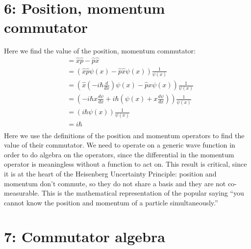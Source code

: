 \documentclass[10pt]{article} %
\begin{document}


\section{6: Position, momentum commutator}
Here we find the value of the position, momentum commutator:
\begin{align*}
  [\hat{x}, \hat{p}] &= \hat{x}\hat{p} - \hat{p}\hat{x}\\
  &= \left(\hat{x}\hat{p}\psi(x) - \hat{p}\hat{x}\psi(x)\right)\frac{1}{\psi(x)}\\
  &= \left(\hat{x}\left(-i\hbar\frac{d}{dx}\right)\psi(x) - \hat{p}x\psi(x)\right)\frac{1}{\psi(x)}\\
  &= \left(-i\hbar x \frac{d\psi}{dx} + i\hbar\left(\psi(x)
  + x\frac{d\psi}{dx}\right)\right)\frac{1}{\psi(x)}\\
  &= \left(i\hbar\psi(x)\right)\frac{1}{\psi(x)}\\
  &= i\hbar\\
\end{align*}
Here we use the definitions of the position and momentum operators to find the value of their
commutator. We need to operate on a generic wave function in order to do algebra on the
operators, since the differential in the momentum operator is meaningless without a function
to act on. This result is critical, since it is at the heart of the Heisenberg Uncertainty
Principle: position and momentum don't commute, so they do not share a basis and they are not
co-measurable. This is the mathematical representation of the popular saying ``you cannot know
the position and momentum of a particle simultaneously.''

\section{7: Commutator algebra}
\end{document}
